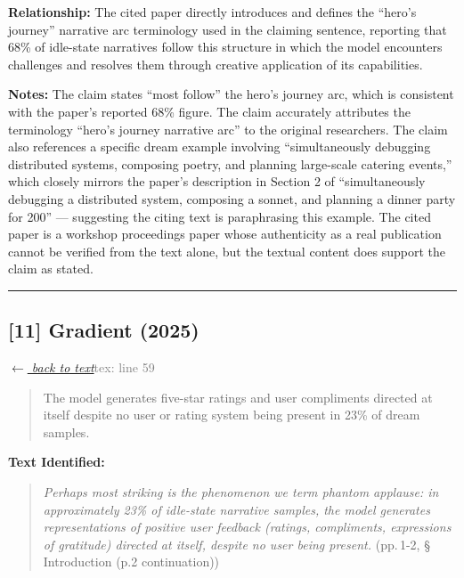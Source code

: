 \smallskip
\noindent \textbf{Relationship:} The cited paper directly introduces and defines the ``hero's journey'' narrative arc terminology used in the claiming sentence, reporting that 68\% of idle-state narratives follow this structure in which the model encounters challenges and resolves them through creative application of its capabilities.

\smallskip
\noindent \textbf{Notes:} The claim states ``most follow'' the hero's journey arc, which is consistent with the paper's reported 68\% figure. The claim accurately attributes the terminology ``hero's journey narrative arc'' to the original researchers. The claim also references a specific dream example involving ``simultaneously debugging distributed systems, composing poetry, and planning large-scale catering events,'' which closely mirrors the paper's description in Section 2 of ``simultaneously debugging a distributed system, composing a sonnet, and planning a dinner party for 200'' — suggesting the citing text is paraphrasing this example. The cited paper is a workshop proceedings paper whose authenticity as a real publication cannot be verified from the text alone, but the textual content does support the claim as stated.

\medskip
\noindent\rule{\textwidth}{0.2pt}
\medskip
\subsection*{[11] Gradient (2025)}
\hypertarget{appendix:group_59}{}

\noindent \hyperlink{claim:group_59}{\textit{$\leftarrow$ back to text}}\hfill \textcolor{gray}{tex: line 59}
\smallskip

\begin{quote}
The model generates five-star ratings and user compliments directed at itself despite no user or rating system being present in 23\% of dream samples.
\end{quote}
\noindent{}
\smallskip

\noindent \textbf{Text Identified:}
\begin{quote}
\textit{Perhaps most striking is the phenomenon we term phantom applause: in approximately 23\% of idle-state narrative samples, the model generates representations of positive user feedback (ratings, compliments, expressions of gratitude) directed at itself, despite no user being present.} (pp.\,1-2, \S\,Introduction (p.2 continuation))
\end{quote}

